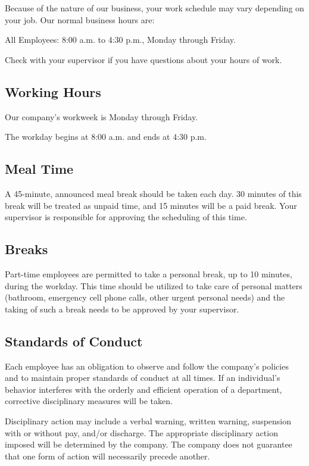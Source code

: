 Because of the nature of our business, your work schedule may vary depending on your job. Our normal business hours are:

All Employees: 8:00 a.m. to 4:30 p.m., Monday through Friday.

Check with your supervisor if you have questions about your hours of work.

\subsection{Working Hours}

Our company's workweek is Monday through Friday.

The workday begins at 8:00 a.m. and ends at 4:30 p.m.

\subsection{Meal Time}

A 45-minute, announced meal break should be taken each day. 30 minutes of this break will be treated as unpaid time, and 15 minutes will be a paid break. Your supervisor is responsible for approving the scheduling of this time.

\subsection{Breaks}

Part-time employees are permitted to take a personal break, up to 10 minutes, during the workday. This time should be utilized to take care of personal matters (bathroom, emergency cell phone calls, other urgent personal needs) and the taking of such a break needs to be approved by your supervisor.

\subsection{Standards of Conduct}

Each employee has an obligation to observe and follow the company's policies and to maintain proper standards of conduct at all times. If an individual's behavior interferes with the orderly and efficient operation of a department, corrective disciplinary measures will be taken.

Disciplinary action may include a verbal warning, written warning, suspension with or without pay, and/or discharge. The appropriate disciplinary action imposed will be determined by the company. The company does not guarantee that one form of action will necessarily precede another.

